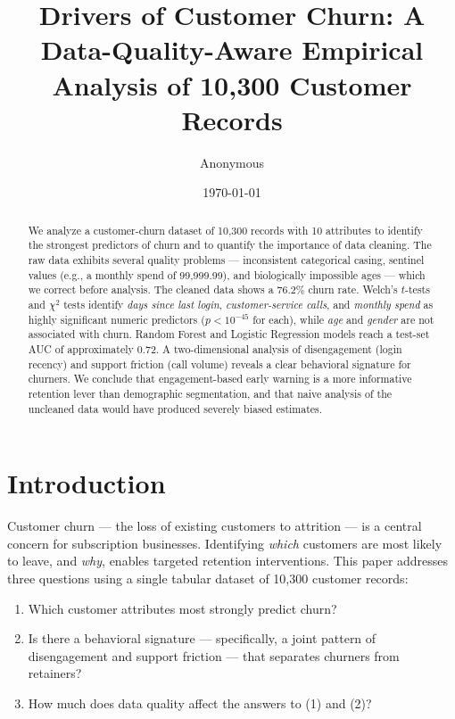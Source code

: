 \documentclass[11pt]{article}
\title{Drivers of Customer Churn: A Data-Quality-Aware Empirical Analysis of 10{,}300 Customer Records}
\author{Anonymous}
\date{\today}
\begin{document}
\maketitle

\begin{abstract}
We analyze a customer-churn dataset of 10{,}300 records with 10 attributes to identify the strongest predictors of churn and to quantify the importance of data cleaning. The raw data exhibits several quality problems --- inconsistent categorical casing, sentinel values (e.g., a monthly spend of 99{,}999.99), and biologically impossible ages --- which we correct before analysis. The cleaned data shows a 76.2\% churn rate. Welch's $t$-tests and $\chi^2$ tests identify \textit{days since last login}, \textit{customer-service calls}, and \textit{monthly spend} as highly significant numeric predictors ($p < 10^{-45}$ for each), while \textit{age} and \textit{gender} are not associated with churn. Random Forest and Logistic Regression models reach a test-set AUC of approximately 0.72. A two-dimensional analysis of disengagement (login recency) and support friction (call volume) reveals a clear behavioral signature for churners. We conclude that engagement-based early warning is a more informative retention lever than demographic segmentation, and that naive analysis of the uncleaned data would have produced severely biased estimates.
\end{abstract}

\section{Introduction}
Customer churn --- the loss of existing customers to attrition --- is a central concern for subscription businesses. Identifying \textit{which} customers are most likely to leave, and \textit{why}, enables targeted retention interventions. This paper addresses three questions using a single tabular dataset of 10{,}300 customer records:

\begin{enumerate}
    \item Which customer attributes most strongly predict churn?
    \item Is there a behavioral signature --- specifically, a joint pattern of disengagement and support friction --- that separates churners from retainers?
    \item How much does data quality affect the answers to (1) and (2)?
\end{enumerate}
\end{document}
